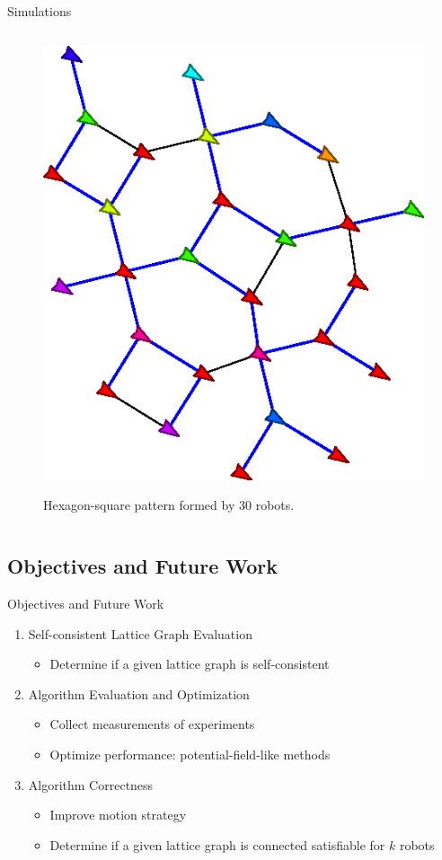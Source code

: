 \begin{frame}{Simulations}
\begin{columns}
\begin{column}{.45\textwidth}
\begin{figure}
          \href{run:shell.command2}{\includegraphics[width=0.8\linewidth]{figs/hexsq}}
          \caption{Hexagon-square pattern formed by 30 robots.}
        \end{figure}
    \end{column}
  \end{columns}
\end{frame}
\subsection[future]{Objectives and Future Work}
\begin{frame}{Objectives and Future Work}{}
  \begin{enumerate}
  \item Self-consistent Lattice Graph Evaluation
    \begin{itemize}
    \item Determine if a given lattice graph is self-consistent
    \end{itemize}
  \item Algorithm Evaluation and Optimization
    \begin{itemize}
    \item Collect measurements of experiments
    \item Optimize performance: potential-field-like methods
    \end{itemize}
  \item Algorithm Correctness
    \begin{itemize}
    \item Improve motion strategy
    \item Determine if a given lattice graph is connected satisfiable for $k$
      robots
    \end{itemize}
  \end{enumerate}
\end{frame}

